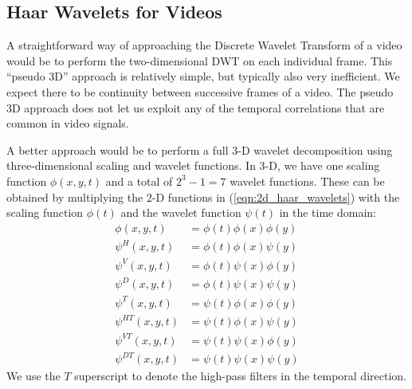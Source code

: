 \subsection{Haar Wavelets for Videos}
A straightforward way of approaching the Discrete Wavelet Transform of a video would be to perform the two-dimensional DWT on each individual frame. 
This ``pseudo 3D'' approach is relatively simple, but typically also very inefficient.
We expect there to be continuity between successive frames of a video.
The pseudo 3D approach does not let us exploit any of the temporal correlations that are common in video signals.

A better approach would be to perform a full 3-D wavelet decomposition using three-dimensional scaling and wavelet functions.
In 3-D, we have one scaling function $\phi(x,y,t)$ and a total of $2^3-1=7$ wavelet functions.
These can be obtained by multiplying the 2-D functions in (\ref{eqn:2d_haar_wavelets}) with the scaling function $\phi(t)$ and the wavelet function $\psi(t)$ in the time domain:
\begin{equation*}
  \begin{split}
    \phi(x,y,t) &= \phi(t) \phi(x) \phi(y)\\
    \psi^H(x,y,t) &=\phi(t) \phi(x) \psi(y) \\
    \psi^V(x,y,t) &=\phi(t) \psi(x) \phi(y) \\
    \psi^D(x,y,t) &=\phi(t) \psi(x) \psi(y) \\
    \psi^T(x,y,t) &= \psi(t) \phi(x) \phi(y)\\
    \psi^{HT}(x,y,t) &=\psi(t) \phi(x) \psi(y) \\
    \psi^{VT}(x,y,t) &=\psi(t) \psi(x) \phi(y) \\
    \psi^{DT}(x,y,t) &=\psi(t) \psi(x) \psi(y)
  \end{split}
\end{equation*}
We use the $T$ superscript to denote the high-pass filters in the temporal direction.

